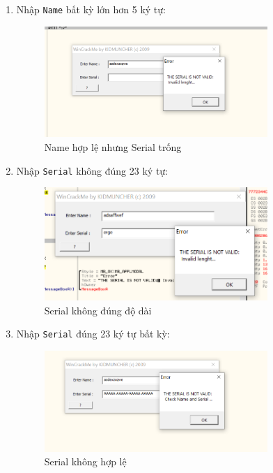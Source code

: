 \begin{itemize}
\begin{enumerate}[label=\textbf{TH\arabic*:}]
        \item Nhập \texttt{Name} bất kỳ lớn hơn 5 ký tự:
        \begin{figure}[H]
            \centering
            \includegraphics[width=0.8\textwidth]{img/file-2/demo6.PNG}
            \caption{Name hợp lệ nhưng Serial trống}
        \end{figure}
        
        \item Nhập \texttt{Serial} không đúng 23 ký tự:
        \begin{figure}[H]
            \centering
            \includegraphics[width=0.8\textwidth]{img/file-2/demo9.PNG}
            \caption{Serial không đúng độ dài}
        \end{figure}
        
        \item Nhập \texttt{Serial} đúng 23 ký tự bất kỳ:
        \begin{figure}[H]
            \centering
            \includegraphics[width=0.8\textwidth]{img/file-2/demo7.PNG}
            \caption{Serial không hợp lệ}
        \end{figure}
        

\end{enumerate}
\end{itemize}
